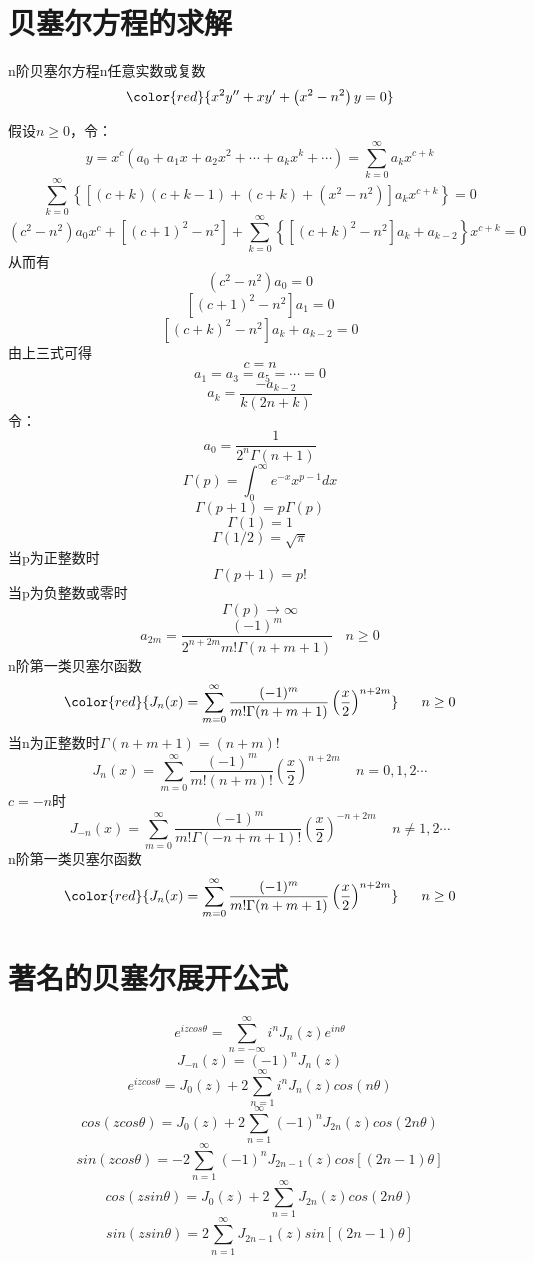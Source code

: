 \section{贝塞尔方程的求解}
n阶贝塞尔方程n任意实数或复数
$$\color{red}{x^{2} y^{\prime \prime}+x y^{\prime}+\left(x^{2}-n^{2}\right) y=0}$$\par
假设$n\geq0$，令：
$$y=x^{c}(a_{0}+a_{1}x+a_{2}x^{2}+\cdots+a_{k}x^{k}+\cdots)=\sum_{k=0}^{\infty}a_{k}x^{c+k}$$
$$\sum_{k=0}^{\infty}\left\{\left[(c+k)(c+k-1)+(c+k)+(x^{2}-n^{2})\right]a_{k}x^{c+k}\right\}=0$$
$$(c^{2}-n^{2})a_{0}x^{c}+\left[(c+1)^{2}-n^{2}\right]+\sum_{k=0}^{\infty}\left\{\left[(c+k)^{2}-n^{2}\right]a_{k}+a_{k-2}\right\}x^{c+k}=0$$
从而有
$$(c^{2}-n^{2})a_{0}=0$$
$$\left[(c+1)^{2}-n^{2}\right]a_{1}=0$$
$$\left[(c+k)^{2}-n^{2}\right]a_{k}+a_{k-2}=0$$
由上三式可得
$$c=n$$
$$a_{1}=a_{3}=a_{5}=\cdots=0$$
$$a_{k}=\frac{-a_{k-2}}{k(2n+k)}$$
令：
$$a_{0}=\frac{1}{2^{n}\Gamma(n+1)}$$
$$\Gamma(p)=\int_{0}^{\infty}e^{-x}x^{p-1}dx$$
$$\Gamma(p+1)=p\Gamma(p)$$
$$\Gamma(1)=1$$
$$\Gamma(1/2)=\sqrt{\pi}$$
当p为正整数时
$$\Gamma(p+1)=p!$$
当p为负整数或零时
$$\Gamma(p)\rightarrow\infty$$
$$a_{2m}=\frac{(-1)^{m}}{2^{n+2m}m!\Gamma(n+m+1)}\ \ \ \ n\geq0$$
n阶第一类贝塞尔函数
$$\color{red}{J_{n}(x)=\sum_{m=0}^{\infty}\frac{(-1)^{m}}{m!\Gamma(n+m+1)}\left(\frac{x}{2}\right)^{n+2m}}\ \ \ \ \ n\geq0$$
当n为正整数时$\Gamma(n+m+1)=(n+m)!$
$$J_{n}(x)=\sum_{m=0}^{\infty}\frac{(-1)^{m}}{m!(n+m)!}\left(\frac{x}{2}\right)^{n+2m}\ \ \ \ \ n=0,1,2\cdots$$
$c=-n$时
$$J_{-n}(x)=\sum_{m=0}^{\infty}\frac{(-1)^{m}}{m!\Gamma(-n+m+1)!}\left(\frac{x}{2}\right)^{-n+2m}\ \ \ \ \ n\neq1,2\cdots$$
n阶第一类贝塞尔函数
$$\color{red}{J_{n}(x)=\sum_{m=0}^{\infty}\frac{(-1)^{m}}{m!\Gamma(n+m+1)}\left(\frac{x}{2}\right)^{n+2m}}\ \ \ \ \ n\geq0$$
\section{著名的贝塞尔展开公式}
$$e^{izcos\theta}=\sum_{n=-\infty}^{\infty}i^{n}J_{n}(z)e^{in\theta}$$
$$J_{-n}(z)=(-1)^{n}J_{n}(z)$$
$$e^{izcos\theta}=J_{0}(z)+2\sum_{n=1}^{\infty}i^{n}J_{n}(z)cos(n\theta)$$
$$cos(zcos\theta)=J_{0}(z)+2\sum_{n=1}^{\infty}(-1)^{n}J_{2n}(z)cos(2n\theta)$$
$$sin(zcos\theta)=-2\sum_{n=1}^{\infty}(-1)^{n}J_{2n-1}(z)cos\left[(2n-1)\theta\right]$$
$$cos(zsin\theta)=J_{0}(z)+2\sum_{n=1}^{\infty}J_{2n}(z)cos(2n\theta)$$
$$sin(zsin\theta)=2\sum_{n=1}^{\infty}J_{2n-1}(z)sin\left[(2n-1)\theta\right]$$